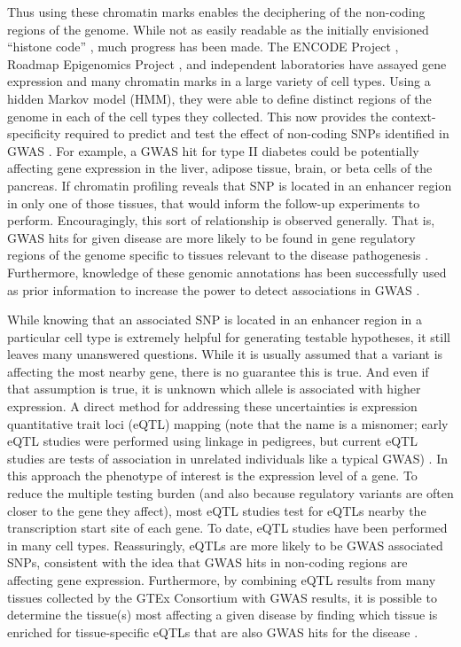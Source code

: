 Thus using these chromatin marks enables the deciphering of the
non-coding regions of the genome. While not as easily readable as the initially
envisioned “histone code” \citep{Jenuwein2001}, much progress has been
made. The ENCODE Project \citep{ENCODE2004, ENCODE2007, ENCODE2012, Kellis2014},
Roadmap Epigenomics Project \citep{Roadmap2015}, and independent laboratories
\citep{Mikkelsen2007} have assayed gene expression and many
chromatin marks in a large variety of cell types. Using a hidden
Markov model (HMM), they were able to define distinct regions of the
genome in each of the cell types they collected. This now provides the
context-specificity required to predict and test the effect of
non-coding SNPs identified in GWAS \citep{Trynka2013}. For example, a GWAS hit for type
II diabetes could be potentially affecting gene expression in the
liver, adipose tissue, brain, or beta cells of the pancreas. If
chromatin profiling reveals that SNP is located in an enhancer region
in only one of those tissues, that would inform the follow-up
experiments to perform. Encouragingly, this sort of relationship is
observed generally. That is, GWAS hits for given disease are more
likely to be found in gene regulatory regions of the genome specific
to tissues relevant to the disease pathogenesis \citep{Trynka2013}. Furthermore,
knowledge of these genomic annotations has been successfully used as
prior information to increase the power to detect associations in
GWAS \citep{Pickrell2014, Wang2016}.

While knowing that an associated SNP is located in an enhancer region
in a particular cell type is extremely helpful for generating testable
hypotheses, it still leaves many unanswered questions. While it is
usually assumed that a variant is affecting the most nearby gene,
there is no guarantee this is true. And even if that assumption is
true, it is unknown which allele is associated with higher
expression. A direct method for addressing these uncertainties is
expression quantitative trait loci (eQTL) mapping (note that the name
is a misnomer; early eQTL studies were performed using linkage in
pedigrees, but current eQTL studies are tests of association in
unrelated individuals like a typical GWAS) \citep{Lappalainen2015}. In this approach the
phenotype of interest is the expression level of a gene. To reduce the
multiple testing burden (and also because regulatory variants are
often closer to the gene they affect), most eQTL studies test for
eQTLs nearby the transcription start site of each gene. To date, eQTL
studies have been performed in many cell types. Reassuringly, eQTLs
are more likely to be GWAS associated SNPs, consistent with the idea
that GWAS hits in non-coding regions are affecting gene
expression. Furthermore, by combining eQTL results from many tissues
collected by the GTEx Consortium with GWAS results, it is possible to
determine the tissue(s) most affecting a given disease by finding
which tissue is enriched for tissue-specific eQTLs that are also GWAS
hits for the disease \citep{Ongen2016}.

